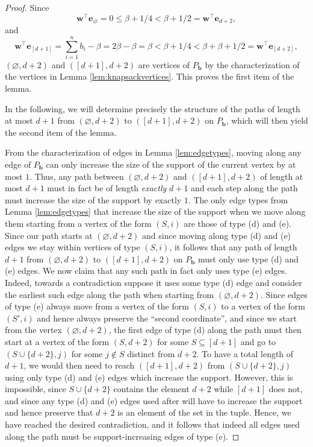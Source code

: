 \documentclass[10pt,a4paper]{amsart}
\renewcommand{\emptyset}{\varnothing}
\begin{document}
\begin{proof}
Since 
\[\mathbf{w}^{\intercal} \mathbf{e}_{\emptyset} = 0 \leq \beta +1/4 < \beta +1/2 = \mathbf{w}^{\intercal} \mathbf{e}_{d+2},\] and 
\[\mathbf{w}^{\intercal} \mathbf{e}_{[d+1]} = \sum_{i=1}^{n} b_{i} -\beta = 2\beta - \beta = \beta < \beta + 1/4 < \beta + \beta +1/2 = \mathbf{w}^{\intercal} \mathbf{e}_{[d+2]},\]
$(\emptyset,d+2)$ and $([d+1],d+2)$ are vertices of $P_{\mathbf{b}}$ by the characterization of the vertices in Lemma \ref{lem:knapsackvertices}. This proves the first item of the lemma.

In the following, we will determine precisely the structure of the paths of length at most $d+1$ from $(\emptyset,d+2)$ to $([d+1],d+2)$ on $P_\mathbf{b}$, which will then yield the second item of the lemma.

From the characterization of edges in Lemma \ref{lem:edgetypes}, moving along any edge of $P_\mathbf{b}$ can only increase the size of the support of the current vertex by at most $1$. Thus, any path between $(\emptyset, d+2)$ and $([d+1], d+2)$ of length at most $d+1$ must in fact be of length \emph{exactly} $d+1$ and each step along the path must increase the size of the support by exactly $1$. The only edge types from Lemma \ref{lem:edgetypes} that increase the size of the support when we move along them starting from a vertex of the form $(S,i)$ are those of type (d) and (e). Since our path starts at $(\emptyset, d+2)$ and since moving along type (d) and (e) edges we stay within vertices of type $(S,i)$, it follows that any path of length $d+1$ from $(\emptyset,d+2)$ to $([d+1],d+2)$ on $P_\mathbf{b}$ must only use type (d) and (e) edges. We now claim that any such path in fact only uses type (e) edges. Indeed, towards a contradiction suppose it uses some type (d) edge and consider the earliest such edge along the path when starting from $(\emptyset, d+2)$. Since edges of type (e) always move from a vertex of the form $(S,i)$ to a vertex of the form $(S',i)$ and hence always preserve the ``second coordinate'', and since we start from the vertex $(\emptyset,d+2)$, the first edge of type (d) along the path must then start at a vertex of the form $(S,d+2)$ for some $S\subseteq [d+1]$ and go to $(S\cup \{d+2\},j)$ for some $j\notin S$ distinct from $d+2$. To have a total length of $d+1$, we would then need to reach $([d+1],d+2)$ from $(S\cup \{d+2\},j)$ using only type (d) and (e) edges which increase the support. However, this is impossible, since $S\cup \{d+2\}$ contains the element $d+2$ while $[d+1]$ does not, and since any type (d) and (e) edges used after will have to increase the support and hence preserve that $d+2$ is an element of the set in the tuple. Hence, we have reached the desired contradiction, and it follows that indeed all edges used along the path must be support-increasing edges of type (e).


\end{proof}
\end{document}
